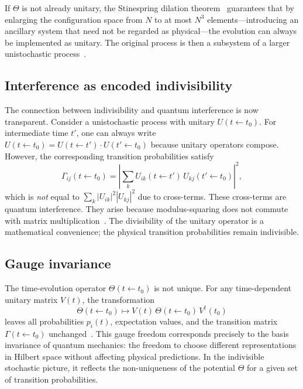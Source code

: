 \documentclass[aps,prd,twocolumn,superscriptaddress,nofootinbib]{revtex4-2}
\begin{document}
If $\Theta$ is not already unitary, the Stinespring dilation theorem~\cite{Stinespring1955} guarantees that by enlarging the configuration space from $N$ to at most $N^3$ elements---introducing an ancillary system that need not be regarded as physical---the evolution can always be implemented as unitary. The original process is then a subsystem of a larger unistochastic process~\cite{Barandes2025SQC,Barandes2025SQT}.

\subsection{Interference as encoded indivisibility}

The connection between indivisibility and quantum interference is now transparent. Consider a unistochastic process with unitary $U(t \leftarrow t_0)$. For intermediate time $t'$, one can always write $U(t \leftarrow t_0) = U(t \leftarrow t') \cdot U(t' \leftarrow t_0)$ because unitary operators compose. However, the corresponding transition probabilities satisfy
\begin{equation}
\Gamma_{ij}(t \leftarrow t_0) = \left| \sum_{k} U_{ik}(t \leftarrow t') \, U_{kj}(t' \leftarrow t_0) \right|^2,
\label{eq:interference}
\end{equation}
which is \emph{not} equal to $\sum_k |U_{ik}|^2 |U_{kj}|^2$ due to cross-terms. These cross-terms are quantum interference. They arise because modulus-squaring does not commute with matrix multiplication~\cite{Barandes2025QSIP}. The divisibility of the unitary operator is a mathematical convenience; the physical transition probabilities remain indivisible.

\subsection{Gauge invariance}

The time-evolution operator $\Theta(t \leftarrow t_0)$ is not unique. For any time-dependent unitary matrix $V(t)$, the transformation
\begin{equation}
\Theta(t \leftarrow t_0) \mapsto V(t)\, \Theta(t \leftarrow t_0)\, V^{\dagger}(t_0)
\label{eq:gauge}
\end{equation}
leaves all probabilities $p_i(t)$, expectation values, and the transition matrix $\Gamma(t \leftarrow t_0)$ unchanged~\cite{Barandes2025QSIP}. This gauge freedom corresponds precisely to the basis invariance of quantum mechanics: the freedom to choose different representations in Hilbert space without affecting physical predictions. In the indivisible stochastic picture, it reflects the non-uniqueness of the potential $\Theta$ for a given set of transition probabilities.
\end{document}

